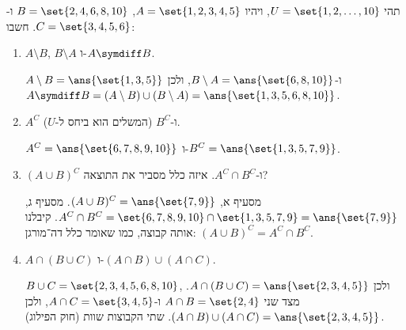 תהי $U=\set{1,2,\dots,10}$, ויהיו $A=\set{1,2,3,4,5}$, $B=\set{2,4,6,8,10}$ ו-$C=\set{3,4,5,6}$. חשבו:
\begin{enumerate}
\item $A\setminus B$, $B\setminus A$ ו-$A\symdiff B$.
\begin{solbox}
$A\setminus B=\ans{\set{1,3,5}}$ ו-$B\setminus A=\ans{\set{6,8,10}}$, ולכן $A\symdiff B=(A\setminus B)\cup(B\setminus A)=\ans{\set{1,3,5,6,8,10}}$.
\end{solbox}
\item $A^C$ ו-$B^C$ (המשלים הוא ביחס ל-$U$).
\begin{solbox}
$A^C=\ans{\set{6,7,8,9,10}}$ ו-$B^C=\ans{\set{1,3,5,7,9}}$.
\end{solbox}
\item $(A\cup B)^C$ ו-$A^C\cap B^C$. איזה כלל מסביר את התוצאה?
\begin{solbox}
מסעיף א, $(A\cup B)^C=\ans{\set{7,9}}$. מסעיף ג, $A^C\cap B^C=\set{6,7,8,9,10}\cap\set{1,3,5,7,9}=\ans{\set{7,9}}$. קיבלנו אותה קבוצה, כמו שאומר כלל דה־מורגן: $(A\cup B)^C=A^C\cap B^C$.
\end{solbox}
\item $A\cap(B\cup C)$ ו-$(A\cap B)\cup(A\cap C)$.
\begin{solbox}
$B\cup C=\set{2,3,4,5,6,8,10}$, ולכן $A\cap(B\cup C)=\ans{\set{2,3,4,5}}$. מצד שני $A\cap B=\set{2,4}$ ו-$A\cap C=\set{3,4,5}$, ולכן $(A\cap B)\cup(A\cap C)=\ans{\set{2,3,4,5}}$. שתי הקבוצות שוות (חוק הפילוג).
\end{solbox}
\end{enumerate}

